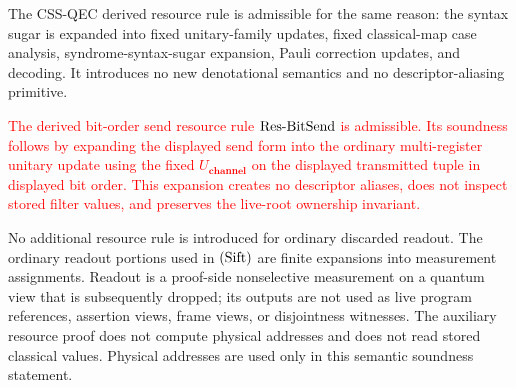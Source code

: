 \documentclass[acmsmall,screen,review,anonymous,nonacm]{acmart}
\theoremstyle{defn_style}
\begin{document}
\begin{theorem}
The CSS-QEC derived resource rule is admissible for the same reason: the syntax sugar
is expanded into fixed unitary-family updates, fixed classical-map case
analysis, syndrome-syntax-sugar expansion, Pauli correction updates, and decoding.
It introduces no new denotational semantics and no descriptor-aliasing
primitive.

\textcolor{red}{The derived bit-order send resource rule
\({\rm Res\mbox{-}BitSend}\) is admissible. Its soundness follows by
expanding the displayed send form into the ordinary multi-register unitary
update using the fixed \(U_{\textbf{channel}}\) on the displayed transmitted
tuple in displayed bit order. This expansion creates no descriptor aliases,
does not inspect stored filter values, and preserves the live-root ownership
invariant.}

No additional resource rule is introduced for ordinary discarded readout. The
ordinary readout portions used in \({\rm (Sift)}\) are finite expansions into
measurement assignments. Readout is a proof-side nonselective measurement
on a quantum view that is subsequently dropped; its outputs are not used
as live program references, assertion views, frame views, or disjointness
witnesses.
The auxiliary resource proof does not compute physical addresses and does not
read stored classical values. Physical addresses are used only in this semantic
soundness statement.

\end{theorem}
\end{document}
